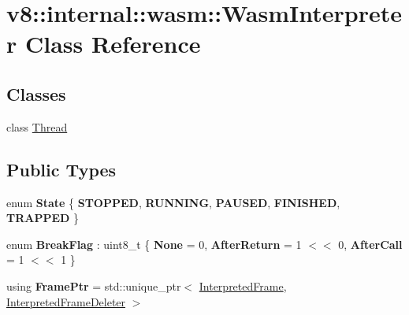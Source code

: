 \hypertarget{classv8_1_1internal_1_1wasm_1_1WasmInterpreter}{}\section{v8\+:\+:internal\+:\+:wasm\+:\+:Wasm\+Interpreter Class Reference}
\label{classv8_1_1internal_1_1wasm_1_1WasmInterpreter}
\subsection*{Classes}
\begin{DoxyCompactItemize}
\item 
class \mbox{\hyperlink{classv8_1_1internal_1_1wasm_1_1WasmInterpreter_1_1Thread}{Thread}}
\end{DoxyCompactItemize}
\subsection*{Public Types}
\begin{DoxyCompactItemize}
\item 
\mbox{\label{classv8_1_1internal_1_1wasm_1_1WasmInterpreter_a3b8474c4efe284e1355383cc20ef971d}} 
enum {\bfseries State} \{ \newline
{\bfseries S\+T\+O\+P\+P\+ED}, 
{\bfseries R\+U\+N\+N\+I\+NG}, 
{\bfseries P\+A\+U\+S\+ED}, 
{\bfseries F\+I\+N\+I\+S\+H\+ED}, 
\newline
{\bfseries T\+R\+A\+P\+P\+ED}
 \}
\item 
\mbox{\label{classv8_1_1internal_1_1wasm_1_1WasmInterpreter_ad4aae87f7e6bc8a943c97c2362937e04}} 
enum {\bfseries Break\+Flag} \+: uint8\+\_\+t \{ {\bfseries None} = 0, 
{\bfseries After\+Return} = 1 $<$$<$ 0, 
{\bfseries After\+Call} = 1 $<$$<$ 1
 \}
\item 
\mbox{\label{classv8_1_1internal_1_1wasm_1_1WasmInterpreter_a1794de09cafc495438a00633765b8532}} 
using {\bfseries Frame\+Ptr} = std\+::unique\+\_\+ptr$<$ \mbox{\hyperlink{classv8_1_1internal_1_1wasm_1_1InterpretedFrame}{Interpreted\+Frame}}, \mbox{\hyperlink{structv8_1_1internal_1_1wasm_1_1InterpretedFrameDeleter}{Interpreted\+Frame\+Deleter}} $>$
\end{DoxyCompactItemize}

